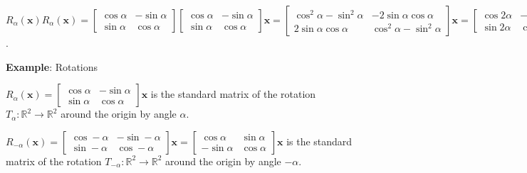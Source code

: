$R_{\alpha}(\mathbf{x}) R_{\alpha}(\mathbf{x}) = \begin{bmatrix} \cos \alpha & -\sin \alpha \\ \sin \alpha & \cos \alpha \end{bmatrix} \begin{bmatrix} \cos \alpha & -\sin \alpha \\ \sin \alpha & \cos \alpha \end{bmatrix} \mathbf{x} = \begin{bmatrix} \cos^2 \alpha - \sin^2 \alpha & -2 \sin \alpha \cos \alpha \\ 2 \sin \alpha \cos \alpha & \cos^2 \alpha - \sin^2 \alpha \end{bmatrix} \mathbf{x} = \begin{bmatrix} \cos 2\alpha & -\sin 2\alpha \\ \sin 2\alpha & \cos 2\alpha \end{bmatrix} \mathbf{x} = R_{2\alpha} \mathbf{x}$.


\textbf{Example}: Rotations

$R_{\alpha}(\mathbf{x}) = \begin{bmatrix} \cos \alpha & -\sin \alpha \\ \sin \alpha & \cos \alpha \end{bmatrix} \mathbf{x}$ is the standard matrix of the rotation $T_{\alpha}: \mathbb{R}^2 \rightarrow \mathbb{R}^2$ around the origin by angle $\alpha$.

$R_{-\alpha}(\mathbf{x}) = \begin{bmatrix} \cos -\alpha & -\sin -\alpha \\ \sin -\alpha & \cos -\alpha \end{bmatrix} \mathbf{x} = \begin{bmatrix} \cos \alpha & \sin \alpha \\ -\sin \alpha & \cos \alpha \end{bmatrix} \mathbf{x}$ is the standard matrix of the rotation $T_{-\alpha}: \mathbb{R}^2 \rightarrow \mathbb{R}^2$ around the origin by angle $-\alpha$.

